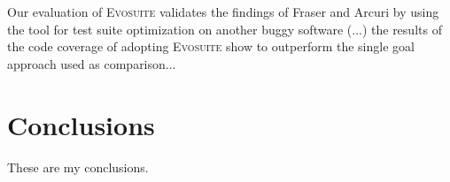 \documentclass[pdftex,english,oribibl]{llncs}
\begin{document}
    Our evaluation of \textsc{Evosuite} validates the findings of Fraser and Arcuri \cite{fraser2013whole} by using the tool for test suite optimization on another buggy software (...) the results of the code coverage of adopting \textsc{Evosuite} show to outperform the single goal approach used as comparison... 
   

\section{Conclusions}\label{sec:conclusions}

  These are my conclusions.
  

\end{document}
